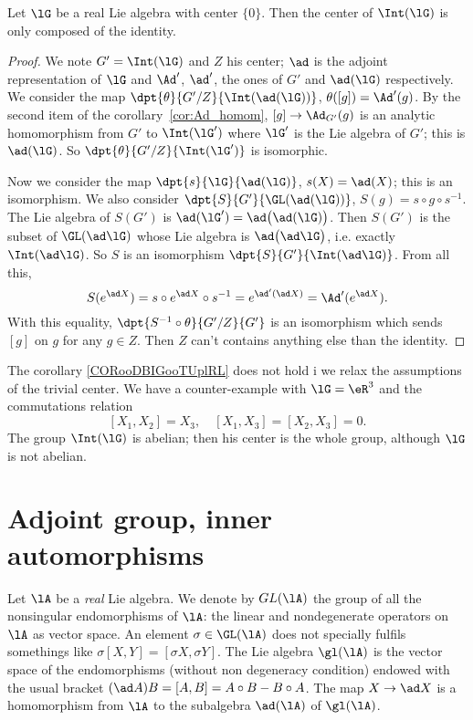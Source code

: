\begin{corollary}       \label{CORooDBIGooTUplRL}
	Let $\lG$ be a real Lie algebra with center $\{0\}$. Then the center of $\Int(\lG)$ is only composed of the identity.
\end{corollary}

\begin{proof}
	We note $G'=\Int(\lG)$ and $Z$ his center; $\ad$ is the adjoint representation of $\lG$ and $\Ad'$, $\ad'$, the ones of $G'$ and $\ad(\lG)$ respectively. We consider the map $\dpt{\theta}{G'/Z}{\Int(\ad(\lG))}$, $\theta([g])=\Ad'(g)$. By the second item of the corollary~\ref{cor:Ad_homom}, $[g]\to\Ad_{G'}(g)$ is an analytic homomorphism from $G'$ to $\Int(\lG')$ where $\lG'$ is the Lie algebra of $G'$; this is $\ad(\lG)$. So $\dpt{\theta}{G'/Z}{\Int(\lG')}$ is isomorphic.

	Now we consider the map $\dpt{s}{\lG}{\ad(\lG)}$, $s(X)=\ad(X)$; this is an isomorphism. We also consider $\dpt{S}{G'}{ \GL(\ad(\lG))}$, $S(g)=s\circ g\circ s^{-1}$. The Lie algebra of $S(G')$ is $\ad(\lG')=\ad\big(\ad(\lG)\big)$. Then $S(G')$ is the subset of $\GL(\ad\lG)$ whose Lie algebra is $\ad\big(\ad\lG\big)$, i.e. exactly $\Int(\ad\lG)$. So $S$ is an isomorphism $\dpt{S}{G'}{\Int(\ad\lG)}$. From all this,
	\begin{equation}
		S(e^{\ad X})=s\circ e^{\ad X}\circ s^{-1}
		=e^{\ad'(\ad X)}
		=\Ad'(e^{\ad X}).
	\end{equation}
	With this equality, $\dpt{S^{-1}\circ\theta}{G'/Z}{G'}$ is an isomorphism which sends $[g]$ on $g$ for any $g\in Z$. Then $Z$ can't contains anything else than the identity.
\end{proof}

\begin{normaltext}
	The corollary \ref{CORooDBIGooTUplRL} does not hold i we relax the assumptions of the trivial center. We have a counter-example with $\lG=\eR^3$ and the commutations relation
	\[
		[X_1,X_2]=X_3,\quad [X_1,X_3]=[X_2,X_3]=0.
	\]
	The group $\Int(\lG)$ is abelian; then his center is the whole group, although $\lG$ is not abelian.
\end{normaltext}

\section{Adjoint group, inner automorphisms}\label{sec:adj_gp}

Let $\lA$ be a \emph{real} Lie algebra. We denote by $GL(\lA)$ the group of all the nonsingular endomorphisms of $\lA$: the linear and nondegenerate operators on $\lA$ as vector space. An element $\sigma\in\GL(\lA)$ does not specially fulfils somethings like $\sigma[X,Y]=[\sigma X,\sigma Y]$. The Lie algebra $\gl(\lA)$ is the vector space of the endomorphisms (without non degeneracy condition) endowed with the usual bracket $(\ad A)B=[A,B]=A\circ B-B\circ A$. The map $X\to\ad X$ is a homomorphism from $\lA$ to the subalgebra $\ad(\lA)$ of $\gl(\lA)$.

